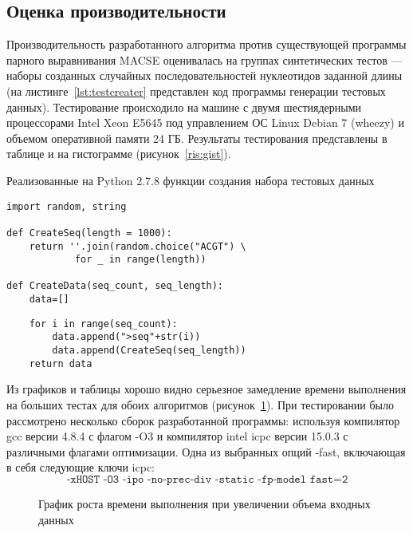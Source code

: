 	

\subsection[Оценка производительности]{\large Оценка производительности}
\hspace{\parindent} Производительность разработанного алгоритма против существующей программы парного выравнивания MACSE оценивалась на группах синтетических тестов --- наборы созданных случайных последовательностей нуклеотидов заданной длины (на листинге~\ref{lst:testcreater} представлен код программы генерации тестовых данных).  Тестирование происходило на машине с двумя шестиядерными процессорами Intel Xeon E5645 под управлением ОС Linux Debian 7 (wheezy) и объемом оперативной памяти 24 ГБ. Результаты тестирования представлены в таблице и на гистограмме (рисунок~\ref{ris:gist}).
\begin{algorithm}[H]
	\caption{Реализованные на Python 2.7.8 функции создания набора тестовых данных} \label{lst:testcreater}
	\begin{lstlisting}
import random, string

def CreateSeq(length = 1000):
    return ''.join(random.choice("ACGT") \
    		for _ in range(length))

def CreateData(seq_count, seq_length):
    data=[]
	\end{lstlisting}
\end{algorithm}

\begin{algorithm}
	\begin{lstlisting}
    for i in range(seq_count):
        data.append(">seq"+str(i))
        data.append(CreateSeq(seq_length))
    return data
	\end{lstlisting}
\end{algorithm}

Из графиков и таблицы хорошо видно серьезное замедление времени выполнения на больших тестах для обоих алгоритмов (рисунок~\ref{ris:multyvsMACSE}). При тестировании было рассмотрено несколько сборок разработанной программы: используя компилятор gcc версии 4.8.4 с флагом -O3 и компилятор intel icpc версии 15.0.3 с различными флагами оптимизации. Одна из выбранных опций -fast, включающая в себя следующие ключи icpc:
\begin{equation*}
\texttt{-xHOST -O3 -ipo -no-prec-div -static -fp-model fast=2}
\end{equation*}

\begin{figure}[h]
	\begin{minipage}[h]{0.49\linewidth}
	\end{minipage}
	\hfill
	\begin{minipage}[h]{0.49\linewidth}
	\end{minipage}
	\caption{График роста времени выполнения при увеличении объема входных данных}
	\label{ris:multyvsMACSE}
\end{figure}

